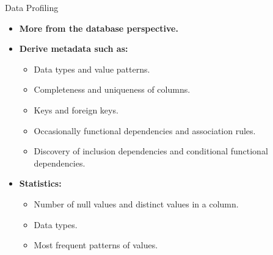 \begin{frame}{Data Profiling}
	\begin{itemize}
		\item \textbf{More from the database perspective.}
		\item \textbf{Derive metadata such as:}
		      \begin{itemize}
			      \item Data types and value patterns.
			      \item Completeness and uniqueness of columns.
			      \item Keys and foreign keys.
			      \item Occasionally functional dependencies and association rules.
			      \item Discovery of inclusion dependencies and conditional functional dependencies.
		      \end{itemize}
		\item \textbf{Statistics:}
		      \begin{itemize}
			      \item Number of null values and distinct values in a column.
			      \item Data types.
			      \item Most frequent patterns of values.
		      \end{itemize}
	\end{itemize}
\end{frame}
